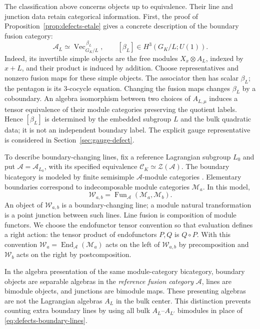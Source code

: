 \documentclass[12pt]{amsart}
\numberwithin{equation}{section}
\theoremstyle{definition}
\begin{document}
The classification above concerns objects up to equivalence.
Their line and junction data retain categorical information.
First, the proof of Proposition~\ref{prop:defects-etale} gives a
concrete description of the boundary fusion category:
\begin{equation}
\label{eq:defects-boundary-associator}
\mathcal A_L\simeq
\operatorname{Vec}^{\,\beta_L}_{G_K/L},\qquad
[\beta_L]\in H^3(G_K/L;U(1)).
\end{equation}
Indeed, its invertible simple objects are the free modules
$X_x\otimes A_L$, indexed by $x+L$, and their product is induced
by addition. Choose representatives and nonzero fusion maps for
these simple objects. The associator then has scalar $\beta_L$;
the pentagon is its $3$-cocycle equation. Changing the fusion maps
changes $\beta_L$ by a coboundary. An algebra isomorphism between
two choices of $A_{L,\mu}$ induces a tensor equivalence of their
module categories preserving the quotient labels. Hence
$[\beta_L]$ is determined by the embedded subgroup $L$ and the
bulk quadratic data; it is not an independent boundary label.
The explicit gauge representative is considered in
Section~\ref{sec:gauge-defect}.

To describe boundary-changing lines, fix a reference Lagrangian
subgroup $L_0$ and put $\mathcal A=\mathcal A_{L_0}$, with its
specified equivalence $\mathcal C_K\simeq\mathcal Z(\mathcal A)$.
The boundary bicategory is modeled by finite semisimple
$\mathcal A$-module categories \cite{Fuchs:2013}. Elementary
boundaries correspond to indecomposable module categories
$\mathcal M_a$. In this model,
\begin{equation}
\label{eq:defects-boundary-lines}
\mathcal W_{a,b}=
\operatorname{Fun}_{\mathcal A}(\mathcal M_a,\mathcal M_b).
\end{equation}
An object of $\mathcal W_{a,b}$ is a boundary-changing line;
a module natural transformation is a point junction between
such lines. Line fusion is composition of module functors. We
choose the endofunctor tensor convention so that evaluation
defines a right action: the tensor product of endofunctors $P,Q$
is $Q\circ P$. With this convention
$\mathcal W_a=\operatorname{End}_{\mathcal A}(\mathcal M_a)$
acts on the left of $\mathcal W_{a,b}$ by precomposition and
$\mathcal W_b$ acts on the right by postcomposition.

In the algebra presentation of the same module-category
bicategory, boundary objects are separable algebras in the
\emph{reference fusion category} $\mathcal A$, lines are bimodule
objects, and junctions are bimodule maps. These presenting
algebras are not the Lagrangian algebras $A_L$ in the bulk center.
This distinction prevents counting extra boundary lines by using
all bulk $A_L$--$A_{L'}$ bimodules in place of
\eqref{eq:defects-boundary-lines}.
\end{document}

